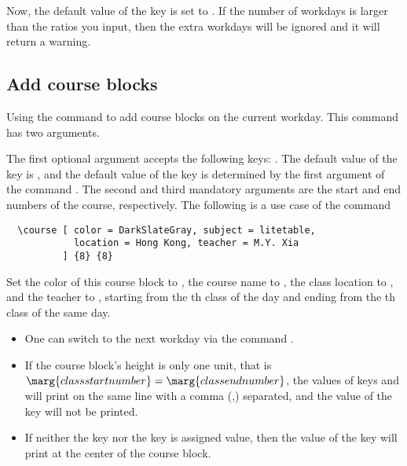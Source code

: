 \documentclass[letterpaper]{l3doc}
\newenvironment{example}{\begin{list}{}{\leftmargin=\parindent}\item }{\end{list}}
\begin{document}
Now, the default value of the key  is set to . If the number of workdays is larger than the ratios you input, then the extra workdays will be ignored and it will return a warning.

\subsection{Add course blocks}

Using the  command to add course blocks on the current workday. This command has two arguments.

\begin{example}
\end{example}

The first optional argument accepts the following keys:     . The default value of the key  is , and the default value of the key  is determined by the first argument of the command . The second and third mandatory arguments are the start and end numbers of the course, respectively. The following is a use case of the command 

\begin{Verbatim}
  \course [ color = DarkSlateGray, subject = litetable,
            location = Hong Kong, teacher = M.Y. Xia
          ] {8} {8}
\end{Verbatim}

\begin{center}
  \noindent\fbox
  {
    \parbox{.94\linewidth}
    {\footnotesize
      Set the color of this course block to , the course name to , the class location to , and the teacher to , starting from the th class of the day and ending from the th class of the same day.
    }
}
\end{center}

\begin{itemize}
  \item One can switch to the next workday via the command .
  \item If the course block's height is only one unit, that is $\marg{class start number} = \marg{class end number}$, the values of keys  and  will print on the same line with a comma (,) separated, and the value of the key  will not be printed.
  \item If neither the key  nor the key  is assigned value, then the value of the key  will print at the center of the course block.
\end{itemize}


\end{document}

